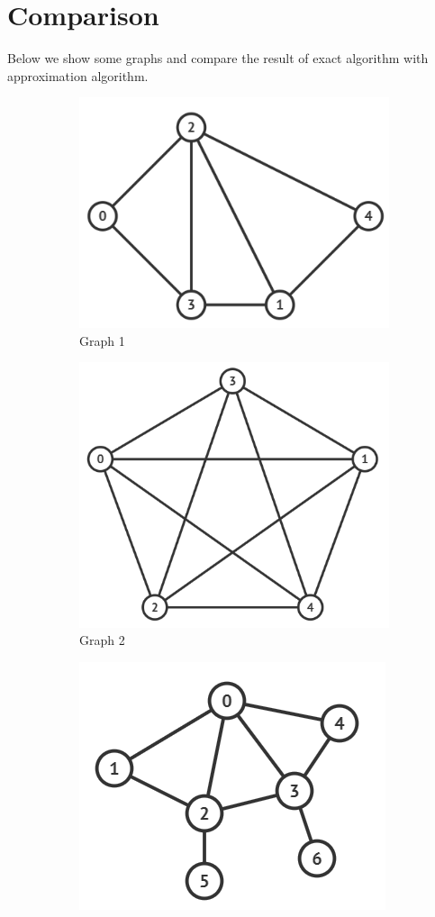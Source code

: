 \documentclass[12pt, a4paper]{article}
\begin{document}
	\section{Comparison}
	Below we show some graphs and compare the result of exact algorithm with approximation algorithm.
	\begin{figure}[h]
		\begin{subfigure}[t]{.3\linewidth}
			\centering
			\includegraphics[width=.8\linewidth]{G1.png}
			\caption{Graph 1}
		\end{subfigure}
		\begin{subfigure}[t]{.3\linewidth}
			\centering
			\includegraphics[width=.8\linewidth]{G2.png}
			\caption{Graph 2}
		\end{subfigure}
		\begin{subfigure}[t]{.3\linewidth}
			\centering
			\includegraphics[width=.8\linewidth]{G4.png}

\end{subfigure}
\end{figure}
\end{document}
